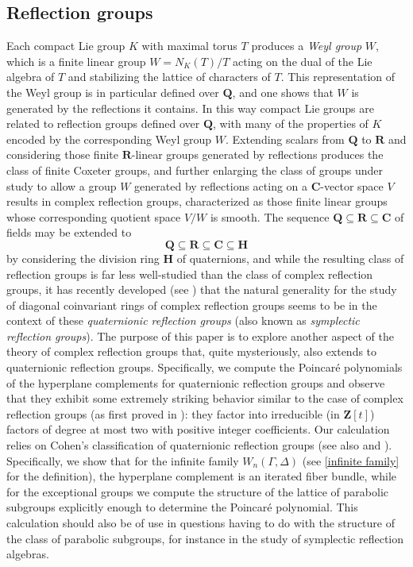 \documentclass[11pt, reqno]{amsart}
\numberwithin{equation}{section}
\theoremstyle{definition}
\theoremstyle{plain}
\newcommand{\CC}{\mathbf{C}}
\newcommand{\HH}{\mathbf{H}}
\newcommand{\RR}{\mathbf{R}}
\newcommand{\QQ}{\mathbf{Q}}
\newcommand{\ZZ}{\mathbf{Z}}
\begin{document}
\subsection{Reflection groups} Each compact Lie group $K$ with maximal torus $T$ produces a \emph{Weyl group} $W$, which is a finite linear group $W=N_K(T)/T$ acting on the dual of the Lie algebra of $T$ and stabilizing the lattice of characters of $T$. This representation of the Weyl group is in particular defined over $\QQ$, and one shows that $W$ is generated by the reflections it contains. In this way compact Lie groups are related to reflection groups defined over $\QQ$, with many of the properties of $K$ encoded by the corresponding Weyl group $W$. Extending scalars from $\QQ$ to $\RR$ and considering those finite $\RR$-linear groups generated by reflections produces the class of finite Coxeter groups, and further enlarging the class of groups under study to allow a group $W$ generated by reflections acting on a $\CC$-vector space $V$ results in complex reflection groups, characterized as those finite linear groups whose corresponding quotient space $V/W$ is smooth. The sequence $\QQ \subseteq \RR \subseteq \CC$ of fields may be extended to $$\QQ \subseteq \RR \subseteq \CC \subseteq \HH$$ by considering the division ring $\HH$ of quaternions, and while the resulting class of reflection groups is far less well-studied than the class of complex reflection groups, it has recently developed (see \cite{CaGr}) that the natural generality for the study of diagonal coinvariant rings of complex reflection groups seems to be in the context of these \emph{quaternionic reflection groups} (also known as \emph{symplectic reflection groups}). The purpose of this paper is to explore another aspect of the theory of complex reflection groups that, quite mysteriously, also extends to quaternionic reflection groups. Specifically, we compute the Poincar\'e polynomials of the hyperplane complements for quaternionic reflection groups and observe that they exhibit some extremely striking behavior similar to the case of complex reflection groups (as first proved in \cite{OrSo}): they factor into irreducible (in $\ZZ[t]$) factors of degree at most two with positive integer coefficients. Our calculation relies on Cohen's classification \cite{Coh} of quaternionic reflection groups (see also \cite{Tay} and \cite{Wal}). Specifically, we show that for the infinite family $W_n(\Gamma,\Delta)$ (see \ref{infinite family} for the definition), the hyperplane complement is an iterated fiber bundle, while for the exceptional groups we compute the structure of the lattice of parabolic subgroups explicitly enough to determine the Poincar\'e polynomial. This calculation should also be of use in questions having to do with the structure of the class of parabolic subgroups, for instance in the study of symplectic reflection algebras. 
\end{document}

